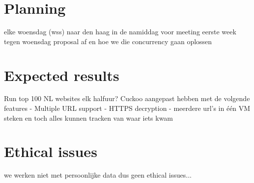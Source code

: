 \documentclass{scrartcl}
\begin{document}
\section{Planning}

elke woensdag (wss) naar den haag in de namiddag voor meeting
eerste week tegen woensdag proposal af en hoe we die concurrency gaan oplossen
 

\section{Expected results}
	Run top 100 NL websites elk halfuur?
	Cuckoo aangepast hebben met de volgende features
		- Multiple URL support
		- HTTPS decryption
		- meerdere url's in één VM steken en toch alles kunnen tracken van waar iets kwam

\section{Ethical issues}
	we werken niet met persoonlijke data dus geen ethical issues...



\end{document}
